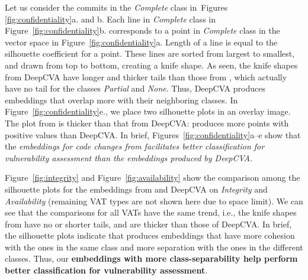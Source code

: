 Let us consider the commits in the {\em Complete} class
in~Figures \ref{fig:confidentiality}a. and b. Each line in {\em
Complete} class in Figure~\ref{fig:confidentiality}b. corresponds to a
point in {\em Complete} class in the vector space in
Figure~\ref{fig:confidentiality}a. Length of a line is equal to
the silhouette coefficient for a point. These lines are
sorted from largest to smallest, and drawn from top to bottom, creating
a knife shape. As seen, the knife shapes from DeepCVA have longer and thicker
tails than those from {\tool}, which actually have no tail for the
classes {\em Partial} and {\em None}. 
Thus, DeepCVA produces embeddings that overlap more with their
neighboring classes.  In Figure~\ref{fig:confidentiality}e., we place
two silhouette plots in an overlay image. The plot from {\tool} is
thicker than that from DeepCVA: {\tool} produces more points with
positive values than DeepCVA. In brief,
Figures~\ref{fig:confidentiality}a--e show that the {\em embeddings
for code changes from {\tool} facilitates better classification for
vulnerability assessment than the embeddings produced by DeepCVA}.



Figure~\ref{fig:integrity} and Figure~\ref{fig:availability} show the
comparison among the silhouette plots for the embeddings from {\tool}
and DeepCVA on {\em Integrity} and {\em Availability} (remaining VAT
types are not shown here due to space limit). We can see that the
comparisons for all VATs have the same trend, i.e., the knife shapes
from {\tool} have no or shorter tails, and are thicker than those of
DeepCVA. In brief, the silhouette plots indicate that {\tool} produces
embeddings that have more cohesion with the ones in the same class and
more separation with the ones in the different classes. Thus, our {\bf
embeddings with more class-separability help {\tool} perform better
classification for vulnerability assessment}.



